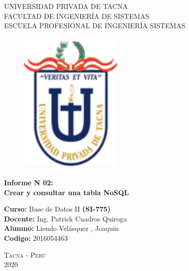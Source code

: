\documentclass[12pt,a4paper,oneside]{book}
\begin{document}
	
	\thispagestyle{empty} 
	
	\begin{center} 
		\LARGE{UNIVERSIDAD PRIVADA DE TACNA} \\[0.5cm] \Large{FACULTAD DE INGENIERÍA DE SISTEMAS}\\[0.5cm] \large{ ESCUELA PROFESIONAL DE INGENIERÍA SISTEMAS} 
	\end{center}
	
	\begin{figure}[htb]
		\centering \includegraphics[width=5cm, height=7cm]{img/uptlogo.png}
	\end{figure}
	
	\begin{center} \LARGE{\bf Informe N 02:}\\ \vspace{.25cm} { 
			\Large \bfseries {Crear y consultar una tabla NoSQL }}\\ 
		
	\end{center}
	
	\large{\bf Curso: } Base de Datos II
	\textbf{(SI-775)}\\
	\large{\bf Docente: } Ing. Patrick Cuadros Quiroga\\
	\large{\bf Alumno: } Liendo Velásquez , Joaquin\\
	\large{\bf Codigo: } 2016054463\\
	
	
	
	\begin{center} 
		\Large \textsc{Tacna - Perú} \\
		\Large \textsc{2020 } 
	\end{center}
\end{document}
